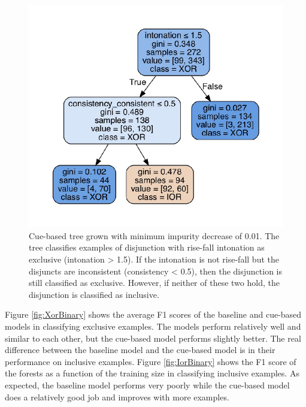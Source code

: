 \documentclass[,man,floatsintext]{apa6}
\begin{document}
\begin{figure}
\centering
\includegraphics{figs/binaryCueBased-1.pdf}
\caption{\label{fig:binaryCueBased}Cue-based tree grown with minimum impurity decrease of 0.01. The tree classifies examples of disjunction with rise-fall intonation as exclusive (intonation \textgreater{} 1.5). If the intonation is not rise-fall but the disjuncts are inconsistent (consistency \textless{} 0.5), then the disjunction is still classified as exclusive. However, if neither of these two hold, the disjunction is classified as inclusive.}
\end{figure}

Figure \ref{fig:XorBinary} shows the average F1 scores of the baseline and cue-based models in classifying exclusive examples. The models perform relatively well and similar to each other, but the cue-based model performs slightly better. The real difference between the baseline model and the cue-based model is in their performance on inclusive examples. Figure \ref{fig:IorBinary} shows the F1 score of the forests as a function of the training size in classifying inclusive examples. As expected, the baseline model performs very poorly while the cue-based model does a relatively good job and improves with more examples.
\end{document}
